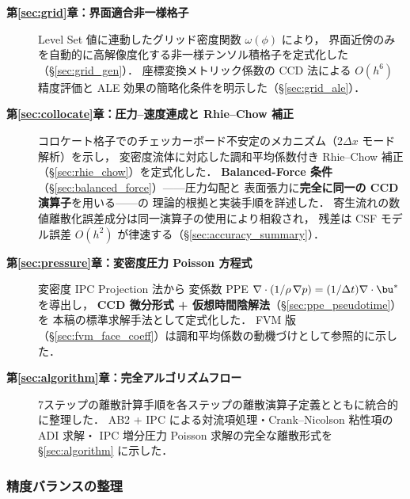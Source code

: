 \begin{description}
  \item[\textbf{第\ref{sec:grid}章：界面適合非一様格子}]
        Level Set 値に連動したグリッド密度関数 $\omega(\phi)$ により，
        界面近傍のみを自動的に高解像度化する非一様テンソル積格子を定式化した（§\ref{sec:grid_gen}）．
        座標変換メトリック係数の CCD 法による $O(h^6)$ 精度評価と
        ALE 効果の簡略化条件を明示した（§\ref{sec:grid_ale}）．

  \item[\textbf{第\ref{sec:collocate}章：圧力--速度連成と Rhie--Chow 補正}]
        コロケート格子でのチェッカーボード不安定のメカニズム（$2\Delta x$ モード解析）を示し，
        変密度流体に対応した調和平均係数付き Rhie--Chow 補正（§\ref{sec:rhie_chow}）を定式化した．
        \textbf{Balanced-Force 条件}（§\ref{sec:balanced_force}）——圧力勾配と
        表面張力に\textbf{完全に同一の CCD 演算子}を用いる——の
        理論的根拠と実装手順を詳述した．
        寄生流れの数値離散化誤差成分は同一演算子の使用により相殺され，
        残差は CSF モデル誤差 $O(h^2)$ が律速する（§\ref{sec:accuracy_summary}）．

  \item[\textbf{第\ref{sec:pressure}章：変密度圧力 Poisson 方程式}]
        変密度 IPC Projection 法から
        変係数 PPE $\nabla\cdot(1/\rho\,\nabla p) = (1/\Delta t)\nabla\cdot\bu^*$ を導出し，
        \textbf{CCD 微分形式 + 仮想時間陰解法}（§\ref{sec:ppe_pseudotime}）を
        本稿の標準求解手法として定式化した．
        FVM 版（§\ref{sec:fvm_face_coeff}）は調和平均係数の動機づけとして参照的に示した．

  \item[\textbf{第\ref{sec:algorithm}章：完全アルゴリズムフロー}]
        7ステップの離散計算手順を各ステップの離散演算子定義とともに統合的に整理した．
        AB2 + IPC による対流項処理・Crank--Nicolson 粘性項の ADI 求解・
        IPC 増分圧力 Poisson 求解の完全な離散形式を §\ref{sec:algorithm} に示した．
\end{description}

\subsubsection{精度バランスの整理}

